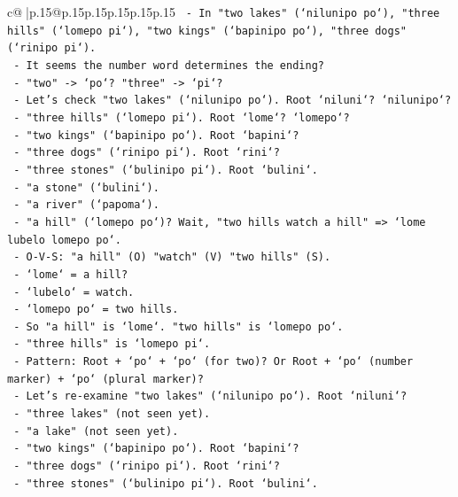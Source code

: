 \documentclass{article}
\begin{document}
{\begin{supertabular}{c@{$\;$}|p{.15\linewidth}@{}p{.15\linewidth}p{.15\linewidth}p{.15\linewidth}p{.15\linewidth}p{.15\linewidth}}
{{{\texttt{      {-} In "two lakes" (`nilunipo po`), "three hills" (`lomepo pi`), "two kings" (`bapinipo po`), "three dogs" (`rinipo pi`).} \\
\texttt{      {-} It seems the number word determines the ending?} \\
\texttt{      {-} "two" {-}> `po`? "three" {-}> `pi`?} \\
\texttt{      {-} Let's check "two lakes" (`nilunipo po`). Root `niluni`? `nilunipo`?} \\
\texttt{      {-} "three hills" (`lomepo pi`). Root `lome`? `lomepo`?} \\
\texttt{      {-} "two kings" (`bapinipo po`). Root `bapini`?} \\
\texttt{      {-} "three dogs" (`rinipo pi`). Root `rini`?} \\
\texttt{      {-} "three stones" (`bulinipo pi`). Root `bulini`.} \\
\texttt{      {-} "a stone" (`bulini`).} \\
\texttt{      {-} "a river" (`papoma`).} \\
\texttt{      {-} "a hill" (`lomepo po`)? Wait, "two hills watch a hill" => `lome lubelo lomepo po`.} \\
\texttt{        {-} O{-}V{-}S: "a hill" (O) "watch" (V) "two hills" (S).} \\
\texttt{        {-} `lome` = a hill?} \\
\texttt{        {-} `lubelo` = watch.} \\
\texttt{        {-} `lomepo po` = two hills.} \\
\texttt{        {-} So "a hill" is `lome`. "two hills" is `lomepo po`.} \\
\texttt{        {-} "three hills" is `lomepo pi`.} \\
\texttt{        {-} Pattern: Root + `po` + `po` (for two)? Or Root + `po` (number marker) + `po` (plural marker)?} \\
\texttt{        {-} Let's re{-}examine "two lakes" (`nilunipo po`). Root `niluni`?} \\
\texttt{        {-} "three lakes" (not seen yet).} \\
\texttt{        {-} "a lake" (not seen yet).} \\
\texttt{        {-} "two kings" (`bapinipo po`). Root `bapini`?} \\
\texttt{        {-} "three dogs" (`rinipo pi`). Root `rini`?} \\
\texttt{        {-} "three stones" (`bulinipo pi`). Root `bulini`.} \\
}}}
\end{supertabular}}
\end{document}
